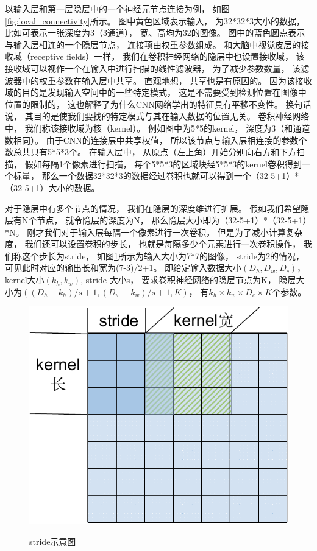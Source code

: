 \begin{enumerate}
以输入层和第一层隐层中的一个神经元节点连接为例， 如图\ref{fig:local_connectivity}所示。 图中黄色区域表示输入， 为32*32*3大小的数据， 比如可表示一张深度为3（3通道）， 宽、高均为32的图像。 图中的蓝色圆点表示与输入层相连的一个隐层节点， 连接项由权重参数组成。 和大脑中视觉皮层的接收域（receptive fields）一样， 我们在卷积神经网络的隐层中也设置接收域， 该接收域可以视作一个在输入中进行扫描的线性滤波器， 为了减少参数数量， 该滤波器中的权重参数在输入层中共享。 直观地想， 共享也是有原因的。 因为该接收域的目的是发现输入空间中的一些特定模式， 这是不需要受到检测位置在图像中位置的限制的， 这也解释了为什么CNN网络学出的特征具有平移不变性。 换句话说， 其目的是使我们要找的特定模式与其在输入数据的位置无关。 卷积神经网络中， 我们称该接收域为核（kernel）。 例如图中为5*5的kernel， 深度为3（和通道数相同）。 由于CNN的连接层中共享权值， 所以该节点与输入层相连接的参数个数总共只有5*5*3个。 在输入层中， 从原点（左上角）开始分别向右方和下方扫描， 假如每隔1个像素进行扫描， 每个5*5*3的区域块经5*5*3的kernel卷积得到一个标量， 那么一个数据32*32*3的数据经过卷积也就可以得到一个（32-5+1）*（32-5+1）大小的数据。

对于隐层中有多个节点的情况， 我们在隐层的深度维进行扩展。 假如我们希望隐层有N个节点， 就令隐层的深度为N， 那么隐层大小即为（32-5+1）*（32-5+1）*N。 刚才我们对于输入层每隔一个像素进行一次卷积， 但是为了减小计算复杂度， 我们还可以设置卷积的步长， 也就是每隔多少个元素进行一次卷积操作， 我们称这个步长为stride， 如图\ref{fig:stride}所示为输入大小为7*7的图像， stride为2的情况， 可见此时对应的输出长和宽为(7-3)/2+1。 即给定输入数据大小$(D_h,D_w,D_c)$， kernel大小$(k_h, k_w)$, stride 大小s， 要求卷积神经网络的隐层节点为K， 隐层大小为$((D_h-k_h)/s+1,(D_w-k_w)/s+1,K)$， 有$k_h\times k_w\times D_c\times K$个参数。


\begin{figure}[htb]
  \centering
  \includegraphics[scale=0.6]{Pictures/CNN/stride-crop.pdf}\\
  \caption{stride示意图}\label{fig:stride}
\end{figure}





\end{enumerate}
